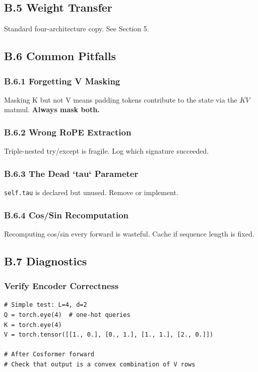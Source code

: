 \subsection{B.5 Weight Transfer}

Standard four-architecture copy. See Section 5.

\subsection{B.6 Common Pitfalls}

\subsubsection{B.6.1 Forgetting V Masking}

Masking K but not V means padding tokens contribute to the state via the 
$KV$ matmul. \textbf{Always mask both.}

\subsubsection{B.6.2 Wrong RoPE Extraction}

Triple-nested try/except is fragile. Log which signature succeeded.

\subsubsection{B.6.3 The Dead `tau` Parameter}

\texttt{self.tau} is declared but unused. Remove or implement.

\subsubsection{B.6.4 Cos/Sin Recomputation}

Recomputing cos/sin every forward is wasteful. Cache if sequence length 
is fixed.

\subsection{B.7 Diagnostics}

\subsubsection{Verify Encoder Correctness}

\begin{lstlisting}
# Simple test: L=4, d=2
Q = torch.eye(4)  # one-hot queries
K = torch.eye(4)
V = torch.tensor([[1., 0.], [0., 1.], [1., 1.], [2., 0.]])

# After Cosformer forward
# Check that output is a convex combination of V rows
\end{lstlisting}

